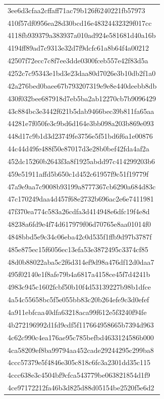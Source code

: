 \begin{tabular}{l}
3ee6d3cfaa2cffaff71ac79b126f6240221fb57973 \\
410f57df0956ea28d30bcd16e48324432329f017cc \\
4118fb939379a383937a010ad924e581681d40a16b \\
4194ff89ad7c9313e32d7f9dcfc61a8b64f4a00212 \\
42507f72ecc7c8f7ee3dde0300fceb557e42f83d5a \\
4252c7c95343e1bd3e23daa80d7026e3b10db2f1a0 \\
42a276bed0baee67b793207319e9e8e440deebb8db \\
430f032bee687918d7eb5ba2ab12270cb7b9096429 \\
43c884bc3e3442f621b5dab9466bec39b811fa65aa \\
44281e7f050fe3c9bd6d164e3bb098a203b869e093 \\
448d17c9b1d3d23749fe3756e5f51bd6f6a1e00876 \\
44c44d49fe488f50e87017d3e28b0bef42fda4af2a \\
452dc15260b2643f3a8f1925abdd97c414299203b6 \\
459e51911affd5b650c1d452c61957f9c51f19779f \\
47a9e9aa7c9008b93199a8777367cb6290a684d83c \\
47c170249daa4d457f68e2732b696ac2e6e7411981 \\
47f370ea774c583a26cdfa3d414948e6dfc19f4e8d \\
48238a6fd9e4f74d617979f06d70765e8aa01014f0 \\
4848bbd5e9c34c06eba42c0d535f1ffb9d97b3787f \\
485e875ec15f6056ec13efa53e3872495c3374cf85 \\
48d0b88022aba5c2f6d314ef9d98a476df12d0daa7 \\
495f02140e1f8afe79b4a6817a4158ce45f7d4241b \\
4983c945c1602fcbf50b10f4d53139227b98b1dfce \\
4a54c55658bc5f5e055bb83c20b264efe9c3d0efef \\
4a911ebfcaa40dfa63218aca99f612e5f3240f94fe \\
4b272196992d1fd9cdf5f117664958665b7394d963 \\
4c62c990c4ea176ae95c785befbd4633124586b000 \\
4ca58209ef8ba99794aa452cade29244295c299ba8 \\
4ccc57379e5f4846e305c818c6fc3a2301dd35c115 \\
4ccc638e3c4504bf9cfca543779be063821854d1f9 \\
4ce97172212fa46b3d825d88d05154be2520f5e6d2 \\

\end{tabular}
